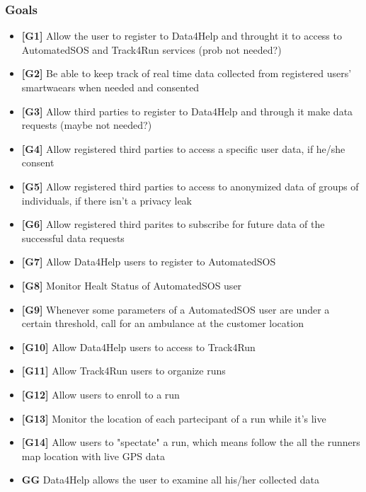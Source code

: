 \subsubsection{Goals}
\begin{itemize}
\item \textbf{[G1]} Allow the user to register to Data4Help and throught it to access to AutomatedSOS and Track4Run services (prob not needed?)
\item \textbf{[G2]} Be able to keep track of real time data collected from registered users' smartwaears when needed and consented
\item \textbf{[G3]} Allow third parties to register to Data4Help and through it make data requests (maybe not needed?)
\item \textbf{[G4]} Allow registered third parties to access a specific user data, if he/she consent
\item \textbf{[G5]} Allow registered third parties to access to anonymized data of groups of individuals, if there isn't a privacy leak
\item \textbf{[G6]} Allow registered third parites to subscribe for future data of the successful data requests
\item \textbf{[G7]} Allow Data4Help users to register to AutomatedSOS
\item \textbf{[G8]} Monitor Healt Status of AutomatedSOS user
\item \textbf{[G9]} Whenever some parameters of a AutomatedSOS user are under a certain threshold, call for an ambulance at the customer location
\item \textbf{[G10]} Allow Data4Help users to access to Track4Run
\item \textbf{[G11]} Allow Track4Run users to organize runs
\item \textbf{[G12]} Allow users to enroll to a run
\item \textbf{[G13]} Monitor the location of each partecipant of a run while it's live
\item \textbf{[G14]} Allow users to "spectate" a run, which means follow the all the runners map location with live GPS data


\item \textbf{GG} Data4Help allows the user to examine all his/her collected data


\end{itemize}
